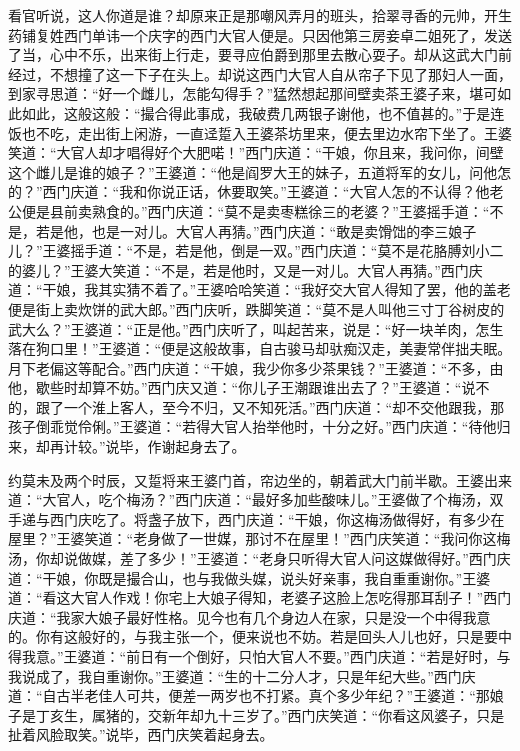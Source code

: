 看官听说，这人你道是谁？却原来正是那嘲风弄月的班头，拾翠寻香的元帅，开生药铺复姓西门单讳一个庆字的西门大官人便是。只因他第三房妾卓二姐死了，发送了当，心中不乐，出来街上行走，要寻应伯爵到那里去散心耍子。却从这武大门前经过，不想撞了这一下子在头上。却说这西门大官人自从帘子下见了那妇人一面，到家寻思道：“好一个雌儿，怎能勾得手？”猛然想起那间壁卖茶王婆子来，堪可如此如此，这般这般：“撮合得此事成，我破费几两银子谢他，也不值甚的。”于是连饭也不吃，走出街上闲游，一直迳踅入王婆茶坊里来，便去里边水帘下坐了。王婆笑道：“大官人却才唱得好个大肥喏！”西门庆道：“干娘，你且来，我问你，间壁这个雌儿是谁的娘子？”王婆道：“他是阎罗大王的妹子，五道将军的女儿，问他怎的？”西门庆道：“我和你说正话，休要取笑。”王婆道：“大官人怎的不认得？他老公便是县前卖熟食的。”西门庆道：“莫不是卖枣糕徐三的老婆？”王婆摇手道：“不是，若是他，也是一对儿。大官人再猜。”西门庆道：“敢是卖馉饳的李三娘子儿？”王婆摇手道：“不是，若是他，倒是一双。”西门庆道：“莫不是花胳膊刘小二的婆儿？”王婆大笑道：“不是，若是他时，又是一对儿。大官人再猜。”西门庆道：“干娘，我其实猜不着了。”王婆哈哈笑道：“我好交大官人得知了罢，他的盖老便是街上卖炊饼的武大郎。”西门庆听，跌脚笑道：“莫不是人叫他三寸丁谷树皮的武大么？”王婆道：“正是他。”西门庆听了，叫起苦来，说是：“好一块羊肉，怎生落在狗口里！”王婆道：“便是这般故事，自古骏马却驮痴汉走，美妻常伴拙夫眠。月下老偏这等配合。”西门庆道：“干娘，我少你多少茶果钱？”王婆道：“不多，由他，歇些时却算不妨。”西门庆又道：“你儿子王潮跟谁出去了？”王婆道：“说不的，跟了一个淮上客人，至今不归，又不知死活。”西门庆道：“却不交他跟我，那孩子倒乖觉伶俐。”王婆道：“若得大官人抬举他时，十分之好。”西门庆道：“待他归来，却再计较。”说毕，作谢起身去了。

约莫未及两个时辰，又踅将来王婆门首，帘边坐的，朝着武大门前半歇。王婆出来道：“大官人，吃个梅汤？”西门庆道：“最好多加些酸味儿。”王婆做了个梅汤，双手递与西门庆吃了。将盏子放下，西门庆道：“干娘，你这梅汤做得好，有多少在屋里？”王婆笑道：“老身做了一世媒，那讨不在屋里！”西门庆笑道：“我问你这梅汤，你却说做媒，差了多少！”王婆道：“老身只听得大官人问这媒做得好。”西门庆道：“干娘，你既是撮合山，也与我做头媒，说头好亲事，我自重重谢你。”王婆道：“看这大官人作戏！你宅上大娘子得知，老婆子这脸上怎吃得那耳刮子！”西门庆道：“我家大娘子最好性格。见今也有几个身边人在家，只是没一个中得我意的。你有这般好的，与我主张一个，便来说也不妨。若是回头人儿也好，只是要中得我意。”王婆道：“前日有一个倒好，只怕大官人不要。”西门庆道：“若是好时，与我说成了，我自重谢你。”王婆道：“生的十二分人才，只是年纪大些。”西门庆道：“自古半老佳人可共，便差一两岁也不打紧。真个多少年纪？”王婆道：“那娘子是丁亥生，属猪的，交新年却九十三岁了。”西门庆笑道：“你看这风婆子，只是扯着风脸取笑。”说毕，西门庆笑着起身去。

